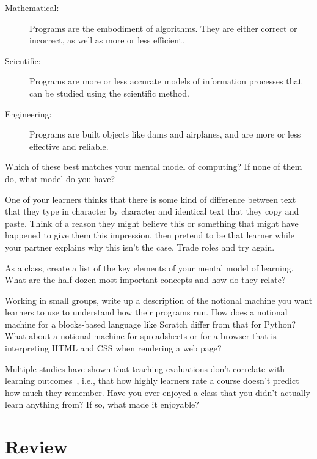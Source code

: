 \begin{description}

\item[Mathematical:]
  Programs are the embodiment of algorithms.
  They are either correct or incorrect,
  as well as more or less efficient.

\item[Scientific:]
  Programs are more or less accurate models of information processes
  that can be studied using the scientific method.

\item[Engineering:]
  Programs are built objects like dams and airplanes,
  and are more or less effective and reliable.

\end{description}

Which of these best matches your mental model of computing?
If none of them do, what model do you have?


One of your learners thinks that there is some kind of difference between
text that they type in character by character
and identical text that they copy and paste.
Think of a reason they might believe this
or something that might have happened to give them this impression,
then pretend to be that learner while your partner explains why this isn't the case.
Trade roles and try again.


As a class,
create a list of the key elements of your mental model of learning.
What are the half-dozen most important concepts and how do they relate?


Working in small groups,
write up a description of the notional machine you want learners to use
to understand how their programs run.
How does a notional machine for a blocks-based language like Scratch
differ from that for Python?
What about a notional machine for spreadsheets
or for a browser that is interpreting HTML and CSS when rendering a web page?


Multiple studies have shown that
teaching evaluations don't correlate with learning outcomes~\cite{Star2014,Uttl2017},
i.e.,
that how highly learners rate a course doesn't predict how much they remember.
Have you ever enjoyed a class that you didn't actually learn anything from?
If so, what made it enjoyable?

\newpage
\section*{Review}


